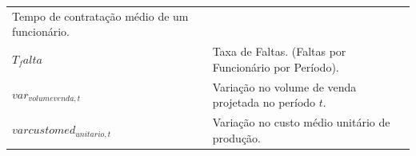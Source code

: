 \documentclass[]{article}
\begin{document}
\begin{longtable}[]{@{}ll@{}}
\begin{minipage}[t]{0.87\columnwidth}
Tempo de contratação médio de um funcionário.\strut
\end{minipage}\tabularnewline
\begin{minipage}[t]{0.07\columnwidth}\raggedright\strut
\(T_falta\)\strut
\end{minipage} & \begin{minipage}[t]{0.87\columnwidth}\raggedright\strut
Taxa de Faltas. (Faltas por Funcionário por Período).\strut
\end{minipage}\tabularnewline
\begin{minipage}[t]{0.07\columnwidth}\raggedright\strut
\(var_{volumevenda, t}\)\strut
\end{minipage} & \begin{minipage}[t]{0.87\columnwidth}\raggedright\strut
Variação no volume de venda projetada no período \(t\).\strut
\end{minipage}\tabularnewline
\begin{minipage}[t]{0.07\columnwidth}\raggedright\strut
\(varcustomed_{unitario, t}\)\strut
\end{minipage} & \begin{minipage}[t]{0.87\columnwidth}\raggedright\strut
Variação no custo médio unitário de produção.\strut
\end{minipage}\tabularnewline
\bottomrule
\end{longtable}
\end{document}
